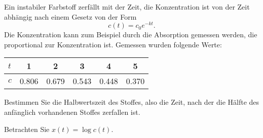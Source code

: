 Ein instabiler Farbstoff zerfällt mit der Zeit, die Konzentration
ist von der Zeit abhängig nach einem Gesetz von der Form
\[
c(t)=c_0e^{-kt}.
\]
Die Konzentration kann zum Beispiel durch die Absorption gemessen
werden, die proportional zur Konzentration ist. Gemessen wurden
folgende Werte:
\begin{center}
\begin{tabular}{|l|ccccc|}
\hline
$t$&1&2&3&4&5
\\
\hline
$c$&0.806&0.679&0.543&0.448&0.370
\\
\hline
\end{tabular}
\end{center}
Bestimmen Sie die Halbwertszeit des Stoffes, also die Zeit, nach
der die Hälfte des anfänglich vorhandenen Stoffes zerfallen ist.


\begin{hinweis}
Betrachten Sie $x(t)=\log c(t)$.
\end{hinweis}

